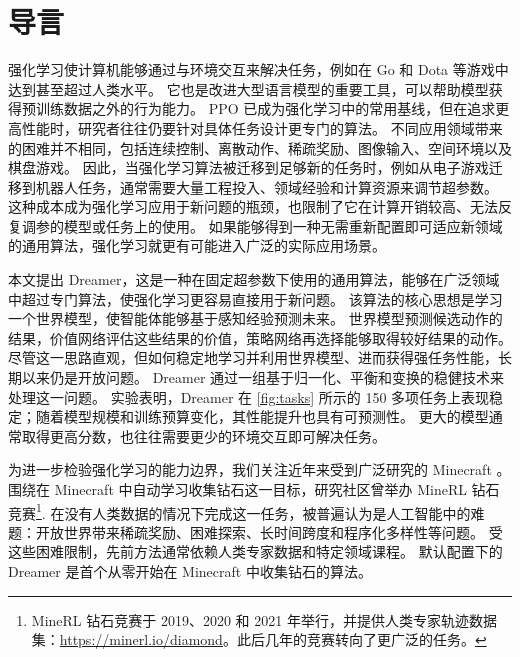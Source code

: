

\enlargethispage{2ex}

\section*{导言}
\label{sec:intro}

强化学习使计算机能够通过与环境交互来解决任务，例如在 Go 和 Dota 等游戏中达到甚至超过人类水平\citep{silver2016alphago,openai2018dota}。
它也是改进大型语言模型的重要工具，可以帮助模型获得预训练数据之外的行为能力\citep{ouyang2022rlhf,le2022coderl}。
PPO \citep{schulman2017ppo} 已成为强化学习中的常用基线，但在追求更高性能时，研究者往往仍要针对具体任务设计更专门的算法。
不同应用领域带来的困难并不相同，包括连续控制\citep{lillicrap2015ddpg}、离散动作\citep{mnih2015dqn,schrittwieser2019muzero}、稀疏奖励\citep{jaderberg2016unreal}、图像输入\citep{anand2019ataristaterep}、空间环境\citep{driess2022nerfrl}以及棋盘游戏\citep{silver2017alphago}。
因此，当强化学习算法被迁移到足够新的任务时，例如从电子游戏迁移到机器人任务，通常需要大量工程投入、领域经验和计算资源来调节超参数\citep{andrychowicz2020whatmatters}。
这种成本成为强化学习应用于新问题的瓶颈，也限制了它在计算开销较高、无法反复调参的模型或任务上的使用。
如果能够得到一种无需重新配置即可适应新领域的通用算法，强化学习就更有可能进入广泛的实际应用场景。

本文提出 Dreamer，这是一种在固定超参数下使用的通用算法，能够在广泛领域中超过专门算法，使强化学习更容易直接用于新问题。
该算法的核心思想是学习一个世界模型，使智能体能够基于感知经验预测未来\citep{sutton1991dyna,finn2017visualforesight,ha2018worldmodels}。
世界模型预测候选动作的结果，价值网络评估这些结果的价值，策略网络再选择能够取得较好结果的动作。
尽管这一思路直观，但如何稳定地学习并利用世界模型、进而获得强任务性能，长期以来仍是开放问题\citep{kaiser2019simple}。
Dreamer 通过一组基于归一化、平衡和变换的稳健技术来处理这一问题。
实验表明，Dreamer 在 \cref{fig:tasks} 所示的 150 多项任务上表现稳定；随着模型规模和训练预算变化，其性能提升也具有可预测性。
更大的模型通常取得更高分数，也往往需要更少的环境交互即可解决任务。

为进一步检验强化学习的能力边界，我们关注近年来受到广泛研究的 Minecraft \citep{guss2019minerl,kanitscheider2021minecraftcurriculum,baker2022vpt}。
围绕在 Minecraft 中自动学习收集钻石这一目标，研究社区曾举办 MineRL 钻石竞赛\footnote{
MineRL 钻石竞赛于 2019、2020 和 2021 年举行，并提供人类专家轨迹数据集：\url{https://minerl.io/diamond}。此后几年的竞赛转向了更广泛的任务。}.
在没有人类数据的情况下完成这一任务，被普遍认为是人工智能中的难题：开放世界带来稀疏奖励、困难探索、长时间跨度和程序化多样性等问题\citep{guss2019minerl}。
受这些困难限制，先前方法通常依赖人类专家数据和特定领域课程\citep{kanitscheider2021minecraftcurriculum,baker2022vpt}。
默认配置下的 Dreamer 是首个从零开始在 Minecraft 中收集钻石的算法。

